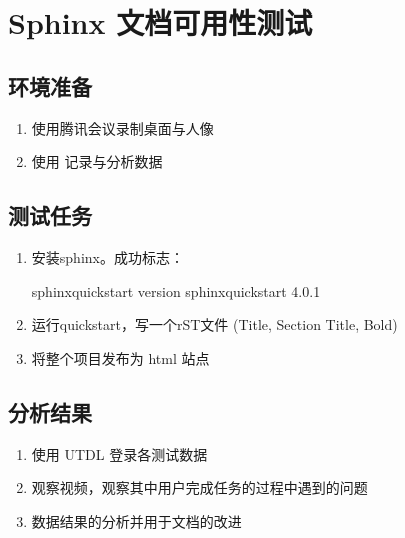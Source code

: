 \documentclass[letterpaper,10pt,english]{sphinxmanual}
\begin{document}
\section{Sphinx 文档可用性测试}
\label{\detokenize{content_test/usability_testing:sphinx}}

\subsection{环境准备}
\label{\detokenize{content_test/usability_testing:id7}}\begin{enumerate}
%
\item {} 
\sphinxAtStartPar
使用腾讯会议录制桌面与人像

\item {} 
\sphinxAtStartPar
使用  记录与分析数据

\end{enumerate}


\subsection{测试任务}
\label{\detokenize{content_test/usability_testing:id8}}\begin{enumerate}
%
\item {} 
\sphinxAtStartPar
安装sphinx。成功标志：

\begin{sphinxVerbatim}[commandchars=\\\{\}]
 \PYGZdl{} sphinx\PYGZhy{}quickstart \PYGZhy{}\PYGZhy{}version
 sphinx\PYGZhy{}quickstart 4.0.1
\end{sphinxVerbatim}

\item {} 
\sphinxAtStartPar
运行quickstart，写一个rST文件 (Title, Section Title, Bold)

\item {} 
\sphinxAtStartPar
将整个项目发布为 html 站点

\end{enumerate}


\subsection{分析结果}
\label{\detokenize{content_test/usability_testing:id9}}\begin{enumerate}
%
\item {} 
\sphinxAtStartPar
使用 UTDL 登录各测试数据

\item {} 
\sphinxAtStartPar
观察视频，观察其中用户完成任务的过程中遇到的问题

\item {} 
\sphinxAtStartPar
数据结果的分析并用于文档的改进

\end{enumerate}
\end{document}
